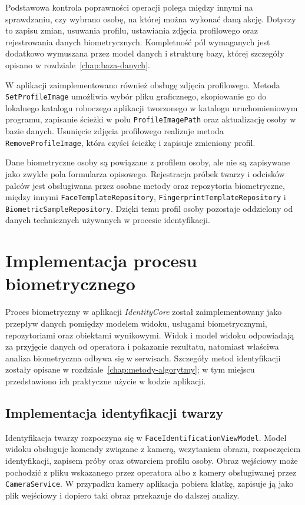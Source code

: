 Podstawowa kontrola poprawności operacji polega między innymi na sprawdzaniu, czy wybrano osobę, na której można wykonać daną akcję. Dotyczy to zapisu zmian, usuwania profilu, ustawiania zdjęcia profilowego oraz rejestrowania danych biometrycznych. Kompletność pól wymaganych jest dodatkowo wymuszana przez model danych i strukturę bazy, której szczegóły opisano w rozdziale~\ref{chap:baza-danych}.

W aplikacji zaimplementowano również obsługę zdjęcia profilowego. Metoda \texttt{SetProfileImage} umożliwia wybór pliku graficznego, skopiowanie go do lokalnego katalogu roboczego aplikacji tworzonego w katalogu uruchomieniowym programu, zapisanie ścieżki w polu \texttt{ProfileImagePath} oraz aktualizację osoby w bazie danych. Usunięcie zdjęcia profilowego realizuje metoda \texttt{RemoveProfileImage}, która czyści ścieżkę i zapisuje zmieniony profil.

\newpage

Dane biometryczne osoby są powiązane z profilem osoby, ale nie są zapisywane jako zwykłe pola formularza opisowego. Rejestracja próbek twarzy i odcisków palców jest obsługiwana przez osobne metody oraz repozytoria biometryczne, między innymi \texttt{FaceTemplateRepository}, \texttt{FingerprintTemplateRepository} i \texttt{BiometricSampleRepository}. Dzięki temu profil osoby pozostaje oddzielony od danych technicznych używanych w procesie identyfikacji.

\section{Implementacja procesu biometrycznego}

Proces biometryczny w aplikacji \textit{IdentityCore} został zaimplementowany jako przepływ danych pomiędzy modelem widoku, usługami biometrycznymi, repozytoriami oraz obiektami wynikowymi. Widok i model widoku odpowiadają za przyjęcie danych od operatora i pokazanie rezultatu, natomiast właściwa analiza biometryczna odbywa się w serwisach. Szczegóły metod identyfikacji zostały opisane w rozdziale~\ref{chap:metody-algorytmy}; w tym miejscu przedstawiono ich praktyczne użycie w kodzie aplikacji.

\subsection{Implementacja identyfikacji twarzy}

Identyfikacja twarzy rozpoczyna się w \texttt{FaceIdentificationViewModel}. Model widoku obsługuje komendy związane z kamerą, wczytaniem obrazu, rozpoczęciem identyfikacji, zapisem próby oraz otwarciem profilu osoby. Obraz wejściowy może pochodzić z pliku wskazanego przez operatora albo z kamery obsługiwanej przez \texttt{CameraService}. W przypadku kamery aplikacja pobiera klatkę, zapisuje ją jako plik wejściowy i dopiero taki obraz przekazuje do dalszej analizy.

